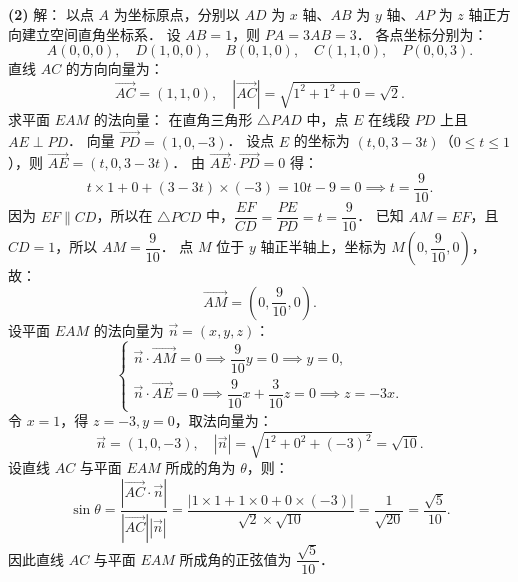 \begin{answer}
\textbf{(2)} 解：
以点 $A$ 为坐标原点，分别以 $AD$ 为 $x$ 轴、$AB$ 为 $y$ 轴、$AP$ 为 $z$ 轴正方向建立空间直角坐标系．
设 $AB = 1$，则 $PA = 3AB = 3$．
各点坐标分别为：
\nopagebreak[4]
\[
A(0, 0, 0), \quad D(1, 0, 0), \quad B(0, 1, 0), \quad C(1, 1, 0), \quad P(0, 0, 3).
\]
直线 $AC$ 的方向向量为：
\nopagebreak[4]
\[
\overrightarrow{AC} = (1, 1, 0), \quad |\overrightarrow{AC}| = \sqrt{1^2 + 1^2 + 0} = \sqrt{2}.
\]
求平面 $EAM$ 的法向量：
在直角三角形 $\triangle PAD$ 中，点 $E$ 在线段 $PD$ 上且 $AE \perp PD$．
向量 $\overrightarrow{PD} = (1, 0, -3)$．
设点 $E$ 的坐标为 $(t, 0, 3 - 3t)$（$0 \leqslant t \leqslant 1$），则 $\overrightarrow{AE} = (t, 0, 3 - 3t)$．
由 $\overrightarrow{AE} \cdot \overrightarrow{PD} = 0$ 得：
\nopagebreak[4]
\[
t \times 1 + 0 + (3 - 3t) \times (-3) = 10t - 9 = 0 \implies t = \frac{9}{10}.
\]
因为 $EF \parallel CD$，所以在 $\triangle PCD$ 中，$\dfrac{EF}{CD} = \dfrac{PE}{PD} = t = \dfrac{9}{10}$．
已知 $AM = EF$，且 $CD = 1$，所以 $AM = \dfrac{9}{10}$．
点 $M$ 位于 $y$ 轴正半轴上，坐标为 $M\left(0, \dfrac{9}{10}, 0\right)$，故：
\nopagebreak[4]
\[
\overrightarrow{AM} = \left(0, \frac{9}{10}, 0\right).
\]
设平面 $EAM$ 的法向量为 $\vec{n} = (x, y, z)$：
\nopagebreak[4]
\[
\begin{cases}
\vec{n} \cdot \overrightarrow{AM} = 0 \implies \dfrac{9}{10}y = 0 \implies y = 0, \\
\vec{n} \cdot \overrightarrow{AE} = 0 \implies \dfrac{9}{10}x + \dfrac{3}{10}z = 0 \implies z = -3x.
\end{cases}
\]
令 $x = 1$，得 $z = -3, y = 0$，取法向量为：
\nopagebreak[4]
\[
\vec{n} = (1, 0, -3), \quad |\vec{n}| = \sqrt{1^2 + 0^2 + (-3)^2} = \sqrt{10}.
\]
设直线 $AC$ 与平面 $EAM$ 所成的角为 $\theta$，则：
\nopagebreak[4]
\[
\sin\theta = \frac{|\overrightarrow{AC} \cdot \vec{n}|}{|\overrightarrow{AC}| |\vec{n}|} = \frac{|1 \times 1 + 1 \times 0 + 0 \times (-3)|}{\sqrt{2} \times \sqrt{10}} = \frac{1}{\sqrt{20}} = \frac{\sqrt{5}}{10}.
\]
因此直线 $AC$ 与平面 $EAM$ 所成角的正弦值为 $\dfrac{\sqrt{5}}{10}$．



\end{answer}
